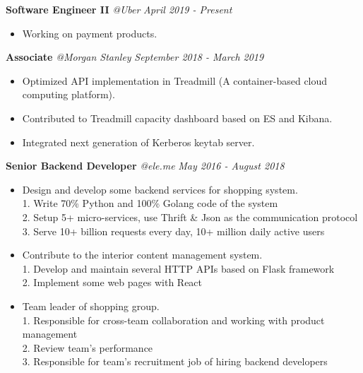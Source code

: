﻿\documentclass[9pt]{article}
\newenvironment{changemargin}[2]{%
  \begin{list}{}{%
    \setlength{\topsep}{0pt}%
    \setlength{\leftmargin}{#1}%
    \setlength{\rightmargin}{#2}%
    \setlength{\listparindent}{\parindent}%
    \setlength{\itemindent}{\parindent}%
    \setlength{\parsep}{\parskip}%
  }%
  \item[]}{\end{list}
}
\newenvironment{body} {
	\vspace*{-16pt}
	\begin{changemargin}{-0.25in}{-0.5in}
  }
	{\end{changemargin}
}
\begin{document}
\begin{body}
    \vspace{14pt}

    \textbf{Software Engineer II} \emph{@Uber} \hfill \emph{April 2019 - Present}\\
    \vspace*{-4pt}
    \begin{itemize} \itemsep -0pt  %
        \item Working on payment products. \\
    \end{itemize}

    \textbf{Associate} \emph{@Morgan Stanley} \hfill \emph{September 2018 - March 2019}\\
    \vspace*{-4pt}
    \begin{itemize} \itemsep -0pt  %
        \item Optimized API implementation in Treadmill (A container-based cloud computing platform). \\
        \item Contributed to Treadmill capacity dashboard based on ES and Kibana. \\
        \item Integrated next generation of Kerberos keytab server.\\
    \end{itemize}

    \textbf{Senior Backend Developer} \emph{@ele.me} \hfill \emph{May 2016 - August 2018}\\
    \vspace*{-4pt}
    \begin{itemize} \itemsep -0pt  %
        \item Design and develop some backend services for shopping system.\\
        1. Write 70\% Python and 100\% Golang code of the system\\
        2. Setup 5+ micro-services, use Thrift \& Json as the communication protocol\\
        3. Serve 10+ billion requests every day, 10+ million daily active users\\
        \item Contribute to the interior content management system.\\
        1. Develop and maintain several HTTP APIs based on Flask framework\\
        2. Implement some web pages with React\\
        \item Team leader of shopping group.\\
        1. Responsible for cross-team collaboration and working with product management\\
        2. Review team's performance\\
        3. Responsible for team's recruitment job of hiring backend developers\\
    \end{itemize}


\end{body}
\end{document}

